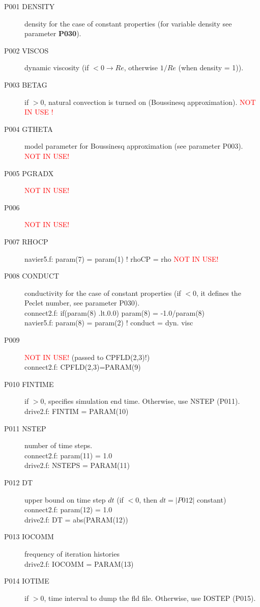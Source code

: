 \begin{description}
\item [P001  DENSITY] density for the case of constant properties (for variable density see parameter \textbf{P030}).
\item [P002  VISCOS]  dynamic viscosity (if \(<0 \rightarrow Re\),
  otherwise \(1/Re\) (when density = 1)).
\item [P003  BETAG] if \(>0\), natural convection is turned on (Boussinesq approximation). {\textcolor{red}{NOT IN USE !}}
\item [P004  GTHETA] model parameter for Boussinesq approximation (see parameter P003). {\textcolor{red}{ NOT IN USE!}}
\item [P005  PGRADX] {\textcolor{red}{ NOT IN USE!}}
\item [P006  ] {\textcolor{red}{ NOT IN USE!}}
\item [P007  RHOCP] navier5.f:      param(7) = param(1)  ! rhoCP   = rho {\textcolor{red}{ NOT IN USE!}}
\item [P008  CONDUCT] conductivity for the case of constant properties (if \(<0\), it defines the Peclet number, see parameter P030). \\
connect2.f:      if(param(8) .lt.0.0) param(8)  = -1.0/param(8)\\
navier5.f:      param(8) = param(2)  ! conduct = dyn. visc
\item [P009  ] {\textcolor{red}{ NOT IN USE!}} (passed to CPFLD(2,3)!)\\
connect2.f:      CPFLD(2,3)=PARAM(9)
\item [P010  FINTIME] if \(>0\), specifies simulation end time. Otherwise, use NSTEP (P011).\\
drive2.f:      FINTIM = PARAM(10)
\item [P011  NSTEP] number of time steps.\\
connect2.f:            param(11) = 1.0\\
drive2.f:      NSTEPS = PARAM(11)
\item [P012  DT] upper bound on time step \(dt\)   (if \(<0\), then \(dt=|P012|\) constant)\\
connect2.f:            param(12) = 1.0\\
drive2.f:      DT     = abs(PARAM(12))
\item [P013  IOCOMM] frequency of iteration histories\\
drive2.f:      IOCOMM = PARAM(13)
\item [P014  IOTIME] if \(>0\), time interval to dump the fld file. Otherwise, use IOSTEP (P015).\\

\end{description}
